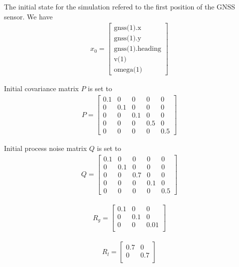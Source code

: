 \documentclass[conference]{IEEEtran}
\begin{document}
The initial state for the simulation refered to the first position of the GNSS sensor. We have \begin{align*}
   x_0 = \begin{bmatrix}
    \text{gnss(1).x} \\ 
    \text{gnss(1).y} \\
    \text{gnss(1).heading} \\
    \text{v(1)} \\
    \text{omega(1)}
    \end{bmatrix}
\end{align*}

\noindent Initial covariance matrix $P$ is set to
\begin{align*}
   P = \begin{bmatrix}
    0.1 & 0 & 0 & 0 & 0 \\ 
    0 & 0.1 & 0 & 0 & 0 \\
    0 & 0 & 0.1 & 0 & 0 \\
    0 & 0 & 0 & 0.5 & 0 \\
    0 & 0 & 0 & 0 & 0.5
    \end{bmatrix}
\end{align*}

\noindent Initial process noise matrix $Q$ is set to
\begin{align*}
   Q = \begin{bmatrix}
    0.1 & 0 & 0 & 0 & 0 \\ 
    0 & 0.1 & 0 & 0 & 0 \\
    0 & 0 & 0.7 & 0 & 0 \\
    0 & 0 & 0 & 0.1 & 0 \\
    0 & 0 & 0 & 0 & 0.5
    \end{bmatrix}
\end{align*}

\begin{align*}
   R_g = \begin{bmatrix}
    0.1 & 0 & 0 \\ 
    0 & 0.1 & 0 \\
    0 & 0 & 0.01  \\
    \end{bmatrix}
\end{align*}


\begin{align*}
   R_l = \begin{bmatrix}
    0.7 & 0 \\ 
    0 & 0.7 \\
    \end{bmatrix}
\end{align*}
\end{document}
